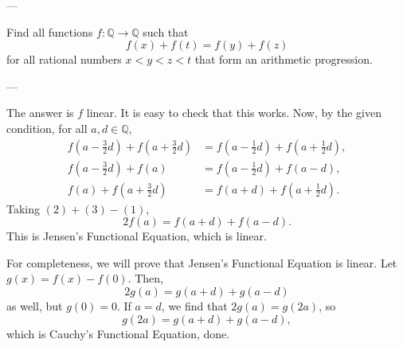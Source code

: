 
---

Find all functions $f:\mathbb Q\to\mathbb Q$ such that \[f(x)+f(t)=f(y)+f(z)\]
for all rational numbers $x<y<z<t$ that form an arithmetic progression.

---

The answer is $f$ linear. It is easy to check that this works. Now, by the given condition, for all $a,d\in\mathbb Q$,
\begin{align}
f\left(a-\frac32d\right)+f\left(a+\frac32d\right)&=f\left(a-\frac12d\right)+f\left(a+\frac12d\right),\\
f\left(a-\frac32d\right)+f(a)&=f\left(a-\frac12d\right)+f(a-d),\\
f(a)+f\left(a+\frac32d\right)&=f(a+d)+f\left(a+\frac12d\right).
\end{align}
Taking $(2)+(3)-(1)$, \[2f(a)=f(a+d)+f(a-d).\]
This is Jensen's Functional Equation, which is linear.

For completeness, we will prove that Jensen's Functional Equation is linear. Let $g(x)=f(x)-f(0)$. Then, \[2g(a)=g(a+d)+g(a-d)\]
as well, but $g(0)=0$. If $a=d$, we find that $2g(a)=g(2a)$, so \[g(2a)=g(a+d)+g(a-d),\]
which is Cauchy's Functional Equation, done.
